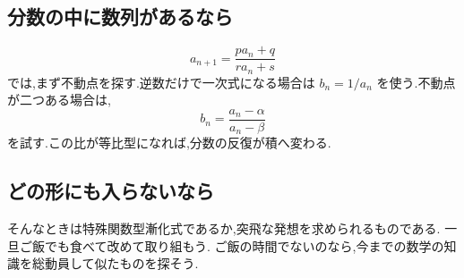 \subsection{分数の中に数列があるなら}

\[
  a_{n+1}=\frac{pa_n+q}{ra_n+s}
\]
では,まず不動点を探す.逆数だけで一次式になる場合は
$b_n=1/a_n$ を使う.不動点が二つある場合は,
\[
  b_n=\frac{a_n-\alpha}{a_n-\beta}
\]
を試す.この比が等比型になれば,分数の反復が積へ変わる.

\subsection{どの形にも入らないなら}

そんなときは特殊関数型漸化式であるか,突飛な発想を求められるものである.
一旦ご飯でも食べて改めて取り組もう.
ご飯の時間でないのなら,今までの数学の知識を総動員して似たものを探そう.